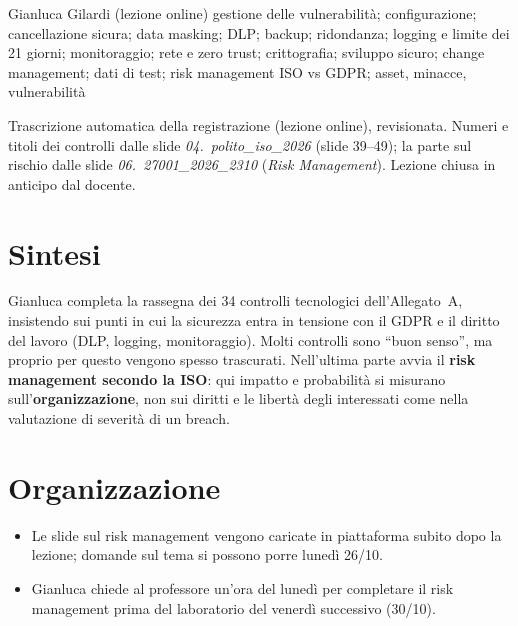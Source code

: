   {Gianluca Gilardi (lezione online)}
  {gestione delle vulnerabilità; configurazione; cancellazione sicura; data masking; DLP; backup;
   ridondanza; logging e limite dei 21 giorni; monitoraggio; rete e zero trust; crittografia;
   sviluppo sicuro; change management; dati di test; risk management ISO vs GDPR; asset, minacce,
   vulnerabilità}
\label{lez:2026-10-23}

\begin{nota}[Fonte]
Trascrizione automatica della registrazione (lezione online), revisionata. Numeri e titoli dei controlli
dalle slide \emph{04.~polito\_iso\_2026} (slide 39--49); la parte sul rischio dalle slide
\emph{06.~27001\_2026\_2310} (\emph{Risk Management}). Lezione chiusa in anticipo dal docente.
\end{nota}

\section{Sintesi}
Gianluca completa la rassegna dei 34 controlli tecnologici dell'Allegato~A, insistendo sui punti in cui
la sicurezza entra in tensione con il GDPR e il diritto del lavoro (DLP, logging, monitoraggio). Molti
controlli sono ``buon senso'', ma proprio per questo vengono spesso trascurati. Nell'ultima parte avvia il
\textbf{risk management secondo la ISO}: qui impatto e probabilità si misurano sull'\textbf{organizzazione},
non sui diritti e le libertà degli interessati come nella valutazione di severità di un breach.

\section{Organizzazione}
\begin{itemize}
  \item Le slide sul risk management vengono caricate in piattaforma subito dopo la lezione; domande
    sul tema si possono porre lunedì 26/10.
  \item Gianluca chiede al professore un'ora del lunedì per completare il risk management prima del
    laboratorio del venerdì successivo (30/10).
\end{itemize}

